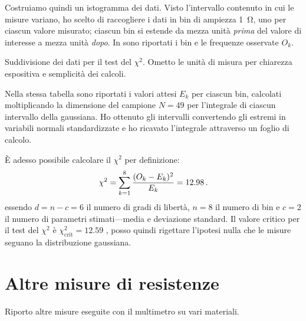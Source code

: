             Costruiamo quindi un istogramma dei dati. Visto l'intervallo contenuto in cui le misure variano, ho scelto di raccogliere i dati in bin di ampiezza \SI{1}{\ohm}, uno per ciascun valore misurato; ciascun bin si estende da mezza unità \emph{prima} del valore di interesse a mezza unità \emph{dopo}. In  sono riportati i bin e le frequenze osservate $O_k$.
            \begin{table}
                \centering
                
                \caption{Suddivisione dei dati per il test del $\chi^2$. Ometto le unità di misura per chiarezza espositiva e semplicità dei calcoli.}
                \label{tab:mul:bin-istogramma}
            \end{table}

            Nella stessa tabella sono riportati i valori attesi $E_k$ per ciascun bin, calcolati moltiplicando la dimensione del campione $N = 49$ per l'integrale di ciascun intervallo della gaussiana. Ho ottenuto gli intervalli convertendo gli estremi in variabili normali standardizzate e ho ricavato l'integrale attraverso un foglio di calcolo.

            È adesso possibile calcolare il $\chi^2$ per definizione:
            \begin{equation*}
                \chi^2
                = \sum_{k=1}^{8} \frac{(O_k - E_k)^2}{E_k}
                = \num{12.98}
                \,.
            \end{equation*}
            essendo $d = n - c = 6$ il numero di gradi di libertà, $n = 8$ il numero di bin e $c = 2$ il numero di parametri stimati---media e deviazione standard. Il valore critico per il test del $\chi^2$ è $\chi^2_\text{crit}= \num{12.59}$ \cite{chi2-table}, posso quindi rigettare l'ipotesi nulla che le misure seguano la distribuzione gaussiana.

    \section{Altre misure di resistenze}
            Riporto altre misure eseguite con il multimetro su vari materiali.
            

